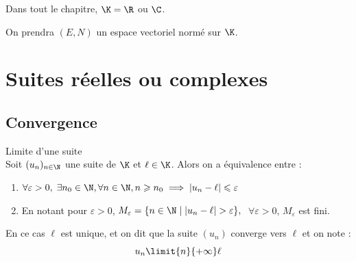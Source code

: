 
Dans tout le chapitre, $\K = \R$ ou $\C$.

On prendra $(E, N)$ un espace vectoriel normé sur $\K$.

\section{Suites réelles ou complexes}

\subsection{Convergence}

\begin{definition}{Limite d'une suite}{}
    \\Soit $(u_n)_{n\in\N}$ une suite de $\K$ et $\ell \in \K$. Alors on a équivalence entre : 

    \begin{enumerate}[label=(\roman*)]
        \item $\forall \varepsilon > 0, \; \exists n_0 \in \N, \forall n \in \N, n \geqslant n_0 \implies |u_n - \ell| \leqslant \varepsilon$

        \item En notant pour $\varepsilon > 0$, $M_\varepsilon = \{n \in \N \mid |u_n - \ell| > \varepsilon\},$ 
        $\; \forall \varepsilon > 0, \, M_\varepsilon$ est fini.
    \end{enumerate}
    

    En ce cas $\ell$ est unique, et on dit que la suite $(u_n)$ converge vers $\ell$ et on note  :
    $$ u_n \limit{n}{+\infty} \ell$$ 
\end{definition}


